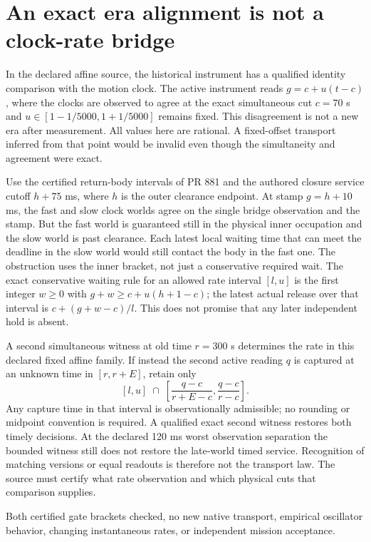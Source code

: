 \documentclass{article}
\begin{document}
\section*{An exact era alignment is not a clock-rate bridge}
In the declared affine source, the historical instrument has a
qualified identity comparison with the motion clock. The active
instrument reads $g=c+u(t-c)$, where the clocks are observed to agree
at the exact simultaneous cut $c=70$ s and
$u\in[1-1/5000,1+1/5000]$ remains fixed. This disagreement is not
a new era after measurement. All values here are rational.
A fixed-offset transport inferred from that point would be
invalid even though the simultaneity and agreement were exact.

Use the certified return-body intervals of PR 881 and the authored
closure service cutoff $h+75$ ms, where $h$ is the outer clearance
endpoint. At stamp $g=h+10$ ms, the fast and slow clock worlds
agree on the single bridge observation and the stamp. But the fast
world is guaranteed still in the physical inner occupation and the
slow world is past clearance. Each latest local waiting time
that can meet the deadline in the slow world would still contact the
body in the fast one. The obstruction uses the inner bracket, not
just a conservative required wait. The exact conservative waiting
rule for an allowed rate interval $[l,u]$ is the first integer
$w\ge0$ with $g+w\ge c+u(h+1-c)$; the latest actual release
over that interval is $c+(g+w-c)/l$. This does not promise that any
later independent hold is absent.

A second simultaneous witness at old time $r=300$ s determines
the rate in this declared fixed affine family. If instead the second
active reading $q$ is captured at an unknown time in $[r,r+E]$,
retain only
\[
 [l,u]\;\cap\;\left[
       \frac{q-c}{r+E-c},\frac{q-c}{r-c}\right].
\]
Any capture time in that interval is observationally admissible;
no rounding or midpoint convention is required. A qualified
exact second witness restores both timely decisions. At the
declared 120 ms worst observation separation the bounded witness
still does not restore the late-world timed service. Recognition
of matching versions or equal readouts is therefore not the
transport law. The source must certify what rate observation and
which physical cuts that comparison supplies.

Both certified gate brackets checked, no new native transport,
empirical oscillator behavior, changing instantaneous rates,
or independent mission acceptance.
\end{document}
